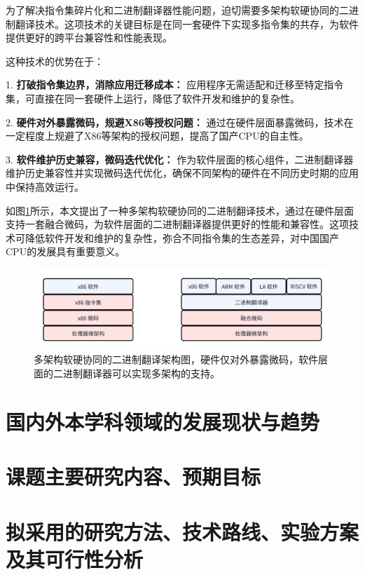 \documentclass{Style/ucasproposal}%
\begin{document}
为了解决指令集碎片化和二进制翻译器性能问题，迫切需要多架构软硬协同的二进制翻译技术。这项技术的关键目标是在同一套硬件下实现多指令集的共存，为软件提供更好的跨平台兼容性和性能表现。

这种技术的优势在于：

1. \textbf{打破指令集边界，消除应用迁移成本：} 应用程序无需适配和迁移至特定指令集，可直接在同一套硬件上运行，降低了软件开发和维护的复杂性。

2. \textbf{硬件对外暴露微码，规避X86等授权问题：} 通过在硬件层面暴露微码，技术在一定程度上规避了X86等架构的授权问题，提高了国产CPU的自主性。

3. \textbf{软件维护历史兼容，微码迭代优化：} 作为软件层面的核心组件，二进制翻译器维护历史兼容性并实现微码迭代优化，确保不同架构的硬件在不同历史时期的应用中保持高效运行。

如图\ref{img:my_arch}所示，本文提出了一种多架构软硬协同的二进制翻译技术，通过在硬件层面支持一套融合微码，为软件层面的二进制翻译器提供更好的性能和兼容性。这项技术可降低软件开发和维护的复杂性，弥合不同指令集的生态差异，对中国国产CPU的发展具有重要意义。


\begin{figure}[h]
    \centering
    \includegraphics[width=1\linewidth]{./feishuImage/my_arch.png}
    \caption{多架构软硬协同的二进制翻译架构图，硬件仅对外暴露微码，软件层面的二进制翻译器可以实现多架构的支持。}
    \label{img:my_arch}
  \end{figure}


\section{国内外本学科领域的发展现状与趋势}



\section{课题主要研究内容、预期目标}



\section{拟采用的研究方法、技术路线、实验方案及其可行性分析}
\end{document}
